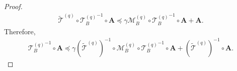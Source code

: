 \documentclass[11pt, letterpaper]{article}
\begin{document}
\begin{proof}
    \begin{equation*}
        \begin{aligned}
            \widetilde{\mathcal{T}}^{(q)}\circ{\mathcal{T}_B^{(q)}}^{-1}\circ\mathbf{A}\preceq \gamma\mathcal{M}_B^{(q)}\circ{\mathcal{T}_B^{(q)}}^{-1}\circ\mathbf{A}+\mathbf{A}.
        \end{aligned}
    \end{equation*}
    Therefore,
    \begin{equation*}
        \begin{aligned}
            {\mathcal{T}_B^{(q)}}^{-1}\circ\mathbf{A} \preceq \gamma{(\widetilde{\mathcal{T}}^{(q)})}^{-1}\circ\mathcal{M}_B^{(q)}\circ{\mathcal{T}_B^{(q)}}^{-1}\circ\mathbf{A}+(\widetilde{\mathcal{T}}^{(q)})^{-1}\circ\mathbf{A}.
        \end{aligned}
    \end{equation*}


\end{proof}
\end{document}
